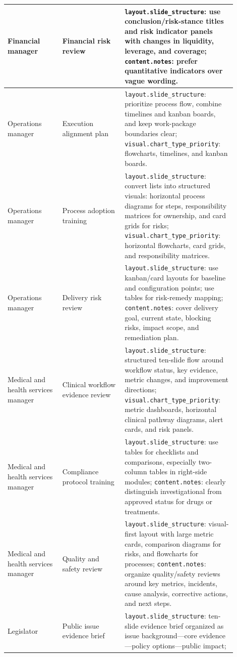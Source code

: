\documentclass{llmxive}
\begin{document}
\begin{longtable}{>{\scriptsize\arraybackslash}p{0.22\linewidth}
                  >{\scriptsize\arraybackslash}p{0.25\linewidth}
                  >{\scriptsize\arraybackslash}p{0.43\linewidth}}
Financial manager & Financial risk review &
\texttt{layout.slide\_structure}: use conclusion/risk-stance titles and risk
indicator panels with changes in liquidity, leverage, and coverage;
\texttt{content.notes}: prefer quantitative indicators over vague wording. \\
\midrule
Operations manager & Execution alignment plan &
\texttt{layout.slide\_structure}: prioritize process flow, combine timelines
and kanban boards, and keep work-package boundaries clear;
\texttt{visual.chart\_type\_priority}: flowcharts, timelines, and kanban
boards. \\
Operations manager & Process adoption training &
\texttt{layout.slide\_structure}: convert lists into structured visuals:
horizontal process diagrams for steps, responsibility matrices for ownership,
and card grids for risks;
\texttt{visual.chart\_type\_priority}: horizontal flowcharts, card grids, and
responsibility matrices. \\
Operations manager & Delivery risk review &
\texttt{layout.slide\_structure}: use kanban/card layouts for baseline and
configuration points; use tables for risk-remedy mapping;
\texttt{content.notes}: cover delivery goal, current state, blocking risks,
impact scope, and remediation plan. \\
\midrule
Medical and health services manager & Clinical workflow evidence review &
\texttt{layout.slide\_structure}: structured ten-slide flow around workflow
status, key evidence, metric changes, and improvement directions;
\texttt{visual.chart\_type\_priority}: metric dashboards, horizontal clinical
pathway diagrams, alert cards, and risk panels. \\
Medical and health services manager & Compliance protocol training &
\texttt{layout.slide\_structure}: use tables for checklists and comparisons,
especially two-column tables in right-side modules;
\texttt{content.notes}: clearly distinguish investigational from approved
status for drugs or treatments. \\
Medical and health services manager & Quality and safety review &
\texttt{layout.slide\_structure}: visual-first layout with large metric cards,
comparison diagrams for risks, and flowcharts for processes;
\texttt{content.notes}: organize quality/safety reviews around key metrics,
incidents, cause analysis, corrective actions, and next steps. \\
\midrule
Legislator & Public issue evidence brief &
\texttt{layout.slide\_structure}: ten-slide evidence brief organized as issue
background---core evidence---policy options---public impact;

\end{longtable}
\end{document}
